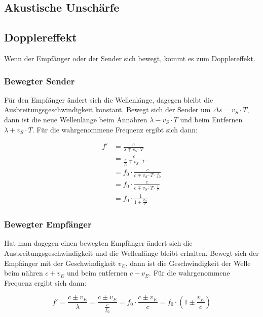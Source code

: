 \documentclass[a4paper]{article}
\begin{document}
		\subsection{Akustische Unschärfe}%
	
		\subsection{Dopplereffekt}
		
			Wenn der Empfänger oder der Sender sich bewegt, kommt es zum Dopplereffekt.
			
			
			\subsubsection{Bewegter Sender}
			
				Für den Empfänger ändert sich die Wellenlänge, dagegen bleibt die Ausbreitungsgeschwindigkeit konstant. Bewegt sich der Sender um $\Delta s = v_S\cdot T$, dann ist die neue Wellenlänge beim Annähren $\lambda - v_S\cdot T$ und beim Entfernen $\lambda + v_S\cdot T$. Für die wahrgenommene Frequenz ergibt sich dann:
				
				\begin{equation}
				\begin{aligned} 
					f'&=\frac{c}{\lambda \mp v_S\cdot T} \\
					&= \frac{c}{\frac{c}{f_0} \mp v_S\cdot T}\\
					&= f_0\cdot\frac{c}{c \mp v_S\cdot T\cdot f_0}\\
					&= f_0\cdot\frac{c}{c \mp v_S\cdot T\cdot \frac{1}{T}}\\
					&= f_0\cdot\frac{1}{1 \mp \frac{v_S}{c}}
				\end{aligned}
				\end{equation}
				
			\subsubsection{Bewegter Empfänger}
				Hat man dagegen einen bewegten Empfänger ändert sich die Ausbreitungsgeschwindigkeit und die Wellenlänge bleibt erhalten. Bewegt sich der Empfänger mit der Geschwindigkeit $v_E$, dann ist die Geschwindigkeit der Welle beim nähren $c+v_E$ und beim entfernen $c-v_E$. Für die wahrgenommene Frequenz ergibt sich dann:
				
				\begin{equation}
					f' = \frac{c \pm v_E}{\lambda} =  \frac{c \pm v_E}{\frac{c}{f_0}} = f_0\cdot\frac{c\pm v_E}{c} = f_0\cdot\left(1\pm \frac{v_E}{c}\right)
				\end{equation}
				
\end{document}
